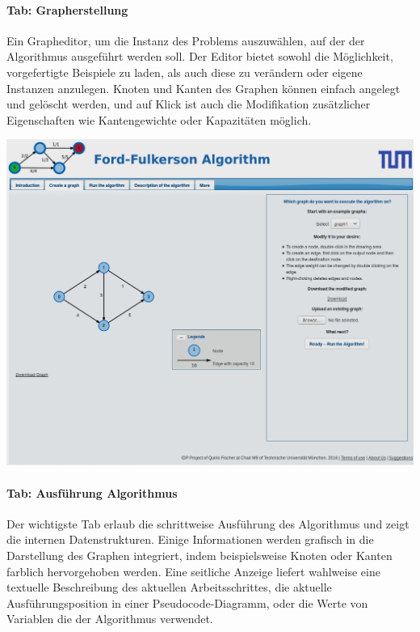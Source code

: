 \paragraph{Tab: Grapherstellung} Ein Grapheditor, um die Instanz des Problems auszuwählen, auf der der Algorithmus ausgeführt werden soll. Der Editor bietet sowohl die Möglichkeit, vorgefertigte Beispiele zu laden, als auch diese zu verändern oder eigene Instanzen anzulegen. Knoten und Kanten des Graphen können einfach angelegt und gelöscht werden, und auf Klick ist auch die Modifikation zusätzlicher Eigenschaften wie Kantengewichte oder Kapazitäten möglich.

\begin{center}
\begin{minipage}[t]{0.60\textwidth}
    \includegraphics[width=\textwidth]{img/layout-2.jpg}
\end{minipage}
\end{center}
\vspace{1cm}

\paragraph{Tab: Ausführung Algorithmus}

Der wichtigste Tab erlaub die schrittweise Ausführung des Algorithmus und zeigt die internen Datenstrukturen. Einige Informationen werden grafisch in die Darstellung des Graphen integriert, indem beispielsweise Knoten oder Kanten farblich hervorgehoben werden. Eine seitliche Anzeige liefert wahlweise eine textuelle Beschreibung des aktuellen Arbeitsschrittes, die aktuelle Ausführungsposition in einer Pseudocode-Diagramm, oder die Werte von Variablen die der Algorithmus verwendet.

